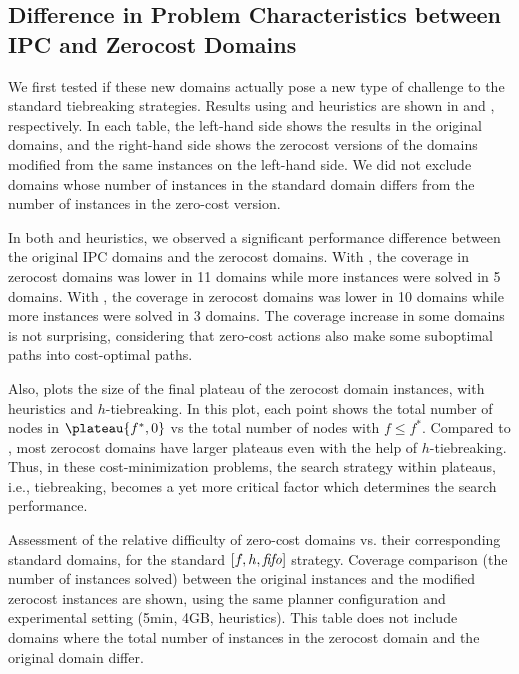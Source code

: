 \subsection{Difference in Problem Characteristics between IPC and Zerocost Domains}

We first tested if these new domains actually pose a new type of challenge to the
standard tiebreaking strategies. Results using \lmcut and \mands
heuristics are shown in  and
, respectively. In each table,
the left-hand side shows the results in the original domains, and the right-hand side
shows the zerocost versions of the domains modified from the same
instances on the left-hand side. We did not exclude domains whose
number of instances in the standard domain differs from the number of instances in the zero-cost version.

In both \lmcut and \mands heuristics, we observed a significant
performance difference between the original IPC domains and the zerocost
domains. With \lmcut, the coverage in zerocost domains
was lower in 11 domains while more instances were solved
in 5 domains. With \mands, the coverage in zerocost domains was lower in 10 domains while
more instances were solved in 3 domains.
The coverage increase in some domains is not surprising, considering that zero-cost actions also make some suboptimal paths into cost-optimal paths.

Also,  plots the size of the final plateau of the
zerocost domain instances, with \lmcut heuristics and $h$-tiebreaking. In this plot,
each point shows the total number of nodes in $\plateau{f^*,0}$ vs the
total number of nodes with $f\leq f^*$. Compared to ,
most zerocost domains have larger plateaus even with the help of
$h$-tiebreaking.  Thus, in these cost-minimization problems, the search
strategy within plateaus, i.e., tiebreaking, becomes a yet more critical
factor which determines the search performance.


\begin{table}[htbp]
 \centering
 
 \caption{
 Assessment of the relative difficulty of zero-cost domains vs. their corresponding standard domains, for the standard $[f,h,{\text{\textit{fifo}}}]$ strategy.
 Coverage comparison (the number of instances solved) 
 between the original instances and the modified zerocost instances are shown, 
 using the same planner configuration and experimental setting (5min, 4GB, \lmcut heuristics).
 This table does not include domains where the total number of instances
 in the zerocost domain  and the original domain differ. 
 }
 \label{tbl:lmcut-zerocost-std}
\end{table}

